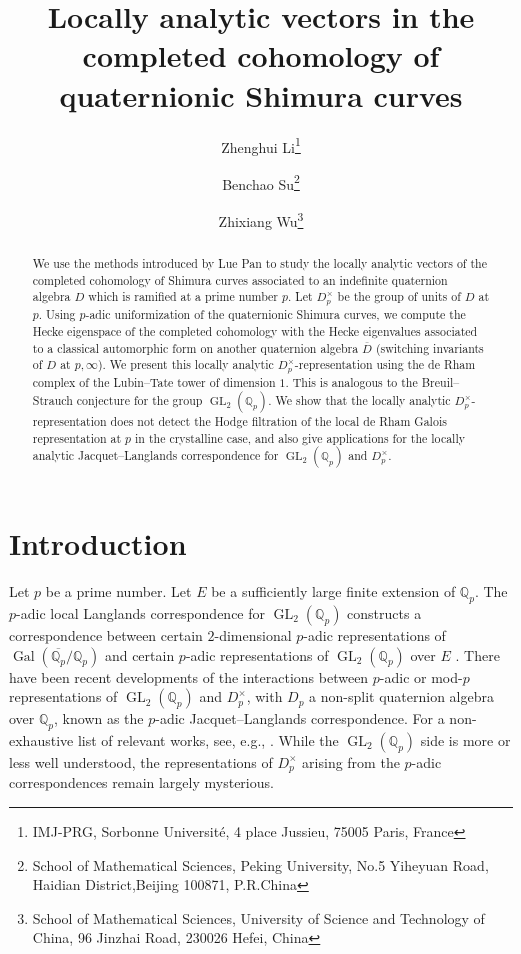 \documentclass{article}
\title{Locally analytic vectors in the completed cohomology of quaternionic Shimura curves}
\author{Zhenghui Li\footnote{IMJ-PRG, Sorbonne Universit\'e, 4 place Jussieu, 75005 Paris, France}\\
\and 
Benchao Su\footnote{School of Mathematical Sciences, Peking University, No.5 Yiheyuan Road, Haidian District,Beijing 100871, P.R.China}\\
\and
Zhixiang Wu\footnote{School of Mathematical Sciences, University of Science and Technology of China, 96 Jinzhai Road, 230026 Hefei, China}}
\date{}
\theoremstyle{definition}
\def\bbQ{\mathbb{Q}}
\DeclareMathOperator{\Gal}{Gal}
\DeclareMathOperator{\GL}{GL}
\def\bar{\overline}
\begin{document}
 

\maketitle


\begin{abstract}
We use the methods introduced by Lue Pan to study the locally analytic vectors of the completed cohomology of Shimura curves associated to an indefinite quaternion algebra $D$ which is ramified at a prime number $p$. Let $D_p^{\times}$ be the group of units of $D$ at $p$. Using $p$-adic uniformization of the quaternionic Shimura curves, we compute the Hecke eigenspace of the completed cohomology with the Hecke eigenvalues associated to a classical automorphic form on another quaternion algebra $\bar D$ (switching invariants of $D$ at $p,\infty$). We present this locally analytic $D_p^\times$-representation using the de Rham complex of the Lubin--Tate tower of dimension $1$. This is analogous to the Breuil--Strauch conjecture for the group $\GL_2(\bbQ_p)$. We show that the locally analytic $D_p^{\times}$-representation does not detect the Hodge filtration of the local de Rham Galois representation at $p$ in the crystalline case, and also give applications for the locally analytic Jacquet--Langlands correspondence for $\GL_2(\bbQ_p)$ and $D_p^\times$.
\end{abstract}
\setcounter{tocdepth}{2}

\tableofcontents

\section{Introduction}
Let $p$ be a prime number. Let $E$ be a sufficiently large finite extension of $\bbQ_p$. The $p$-adic local Langlands correspondence for $\GL_2(\bbQ_p)$ constructs a correspondence between certain $2$-dimensional $p$-adic representations of $\Gal(\overline{\bbQ_p}/\bbQ_p)$ and certain $p$-adic representations of $\GL_2(\bbQ_p)$ over $E$ \cite{breuil2010emerging,colmez2010representations,MR3272011}. There have been recent developments of the interactions between $p$-adic or mod-$p$ representations of $\GL_2(\bbQ_p)$ and $D_p^\times$, with $D_p$ a non-split quaternion algebra over $\bbQ_p$, known as the $p$-adic Jacquet--Langlands correspondence. For a non-exhaustive list of relevant works, see, e.g., \cite{Scholze2018LubinTate, ludwig2017quotient, pavskunas2022some,hansen2022padicsheavesclassifyingstacks,HuWang,hu2024some,dospinescu2024jacquetlanglandsfunctorpadiclocally}. While the $\GL_2(\bbQ_p)$ side is more or less well understood, the representations of $D_p^\times$ arising from the $p$-adic correspondences remain largely mysterious.
\end{document}

